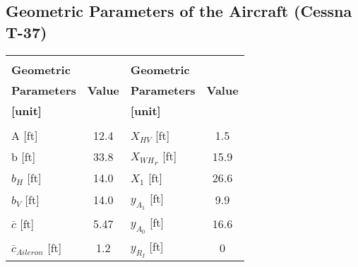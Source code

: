 \documentclass[letterpaper,12pt]{article}
\begin{document}
\subsection{Geometric Parameters of the Aircraft (Cessna T-37)}
\vspace{0.5cm}
\begin{center}
\begin{tabular}{lclc}
\hline\vspace*{-0.2cm} \\ \vspace*{-0.2cm}
\textbf{Geometric}\hspace*{1.5cm} & \hspace*{3cm} & \textbf{Geometric} \hspace*{1.5cm}& \vspace*{0.15cm}\\ \vspace*{0.3cm}
\textbf{Parameters} \hspace*{1.5cm}& \textbf{Value}\hspace*{3cm}& \textbf{Parameters} \hspace*{1.5cm}&  \textbf{Value}\vspace*{-0.3cm}\\ \vspace*{0.2cm}
\textbf{[unit]} \hspace*{1.5cm}& \hspace*{3cm}& \textbf{[unit]} \hspace*{1.5cm}& \\ \hline \\ 
A [ft] & \hspace*{-3cm}12.4 & $X_{HV}$ [ft] & 1.5\vspace*{0.12cm}\\ 
b [ft] &\hspace*{-3cm} 33.8 &${X_{WH}}_r$ [ft] & 15.9\vspace*{0.12cm}\\
$b_H$ [ft] &\hspace*{-3cm} 14.0 & $X_1$ [ft] & 26.6 \vspace*{0.12cm}\\
$b_V$ [ft] &\hspace*{-3cm} 14.0 &$y_{A_1}$ [ft] & 9.9\vspace*{0.12cm}\\
$\bar{c}$ [ft] &\hspace*{-3cm} 5.47 & $y_{A_0}$ [ft] & 16.6\vspace*{0.12cm}\\
$\bar{c}_{Aileron}$ [ft] &\hspace*{-3cm} 1.2 & $y_{R_I}$ [ft] & 0\vspace*{0.12cm}\\

\end{tabular}
\end{center}
\end{document}
